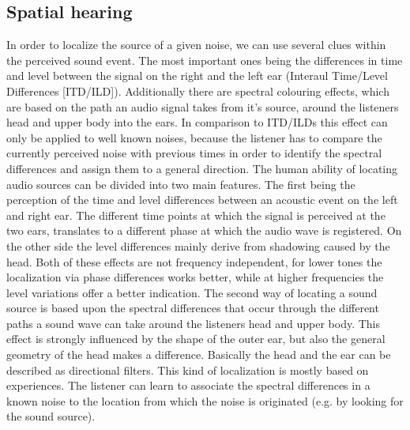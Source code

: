 \documentclass[a4paper,11pt]{article}%
\renewcommand{\\}{\vspace*{0.5\baselineskip} \newline}
\begin{document}
\subsection{Spatial hearing}
In order to localize the source of a given noise, we can use several clues within the perceived sound event. The most important ones being the differences in time and level between the signal on the right and the left ear (Interaul Time/Level Differences [ITD/ILD]). Additionally there are spectral colouring effects, which are based on the path an audio signal takes from it's source, around the listeners head and upper body into the ears. In comparison to ITD/ILDs this effect can only be applied to well known noises, because the listener has to compare the currently perceived noise with previous times in order to identify the spectral differences and assign them to a general direction.   
\newline
\newline
The human ability of locating audio sources can be divided into two main features. The first being the perception of the time and level differences between an acoustic event on the left and right ear. The different time points at which the signal is perceived at the two ears, translates to a different phase at which the audio wave is registered. On the other side the level differences mainly derive from shadowing caused by the head. Both of these effects are not frequency independent, for lower tones the localization via phase differences works better, while at higher frequencies the level variations offer a better indication.
\newline
\newline
The second way of locating a sound source is based upon the spectral differences that occur through the different paths a sound wave can take around the listeners head and upper body. This effect is strongly influenced by the shape of the outer ear, but also the general geometry of the head makes a difference. Basically the head and the ear can be described as directional filters. This kind of localization is mostly based on experiences. The listener can learn to associate the spectral differences in a known noise to the location from which the noise is originated (e.g. by looking for the sound source).

\end{document}
